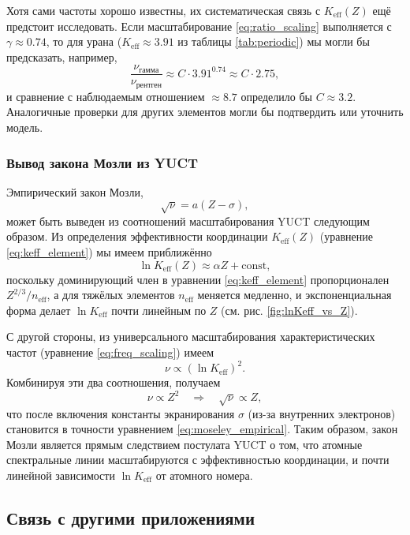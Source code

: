 \documentclass[12pt,a4paper]{article}
\theoremstyle{remark}
\begin{document}
	Хотя сами частоты хорошо известны, их систематическая связь с \(K_{\mathrm{eff}}(Z)\) ещё предстоит исследовать. Если масштабирование \eqref{eq:ratio_scaling} выполняется с \(\gamma \approx 0.74\), то для урана (\(K_{\mathrm{eff}}\approx 3.91\) из таблицы \ref{tab:periodic}) мы могли бы предсказать, например,
	\[
	\frac{\nu_{\text{гамма}}}{\nu_{\text{рентген}}} \approx C \cdot 3.91^{0.74} \approx C \cdot 2.75,
	\]
	и сравнение с наблюдаемым отношением \(\approx 8.7\) определило бы \(C \approx 3.2\). Аналогичные проверки для других элементов могли бы подтвердить или уточнить модель.
	
	\subsubsection{Вывод закона Мозли из YUCT}
	\label{sec:moseley_derivation}
	
	Эмпирический закон Мозли,
	\begin{equation}
		\sqrt{\nu} = a (Z - \sigma),
		\label{eq:moseley_empirical}
	\end{equation}
	может быть выведен из соотношений масштабирования YUCT следующим образом. Из определения эффективности координации \(K_{\mathrm{eff}}(Z)\) (уравнение \ref{eq:keff_element}) мы имеем приближённо
	\[
	\ln K_{\mathrm{eff}}(Z) \approx \alpha Z + \text{const},
	\]
	поскольку доминирующий член в уравнении \ref{eq:keff_element} пропорционален \(Z^{2/3}/n_{\mathrm{eff}}\), а для тяжёлых элементов \(n_{\mathrm{eff}}\) меняется медленно, и экспоненциальная форма делает \(\ln K_{\mathrm{eff}}\) почти линейным по \(Z\) (см. рис. \ref{fig:lnKeff_vs_Z}).
	
	С другой стороны, из универсального масштабирования характеристических частот (уравнение \ref{eq:freq_scaling}) имеем
	\[
	\nu \propto (\ln K_{\mathrm{eff}})^2.
	\]
	Комбинируя эти два соотношения, получаем
	\[
	\nu \propto Z^2 \quad \Longrightarrow \quad \sqrt{\nu} \propto Z,
	\]
	что после включения константы экранирования \(\sigma\) (из-за внутренних электронов) становится в точности уравнением \ref{eq:moseley_empirical}. Таким образом, закон Мозли является прямым следствием постулата YUCT о том, что атомные спектральные линии масштабируются с эффективностью координации, и почти линейной зависимости \(\ln K_{\mathrm{eff}}\) от атомного номера.
	
	\subsection{Связь с другими приложениями}
	
\end{document}
